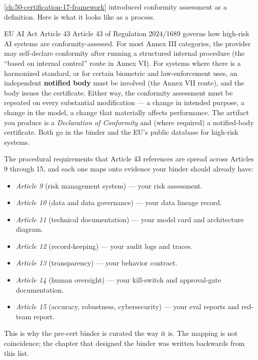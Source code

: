 \autoref{ch:50-certification-17-framework} introduced conformity assessment as a definition. Here is what it looks like as a process.

\begin{TNinpractice}{EU AI Act Article 43} Article 43 of Regulation 2024/1689 \citep{euAIact2024} governs how high-risk AI systems are conformity-assessed. For most Annex III categories, the provider may self-declare conformity after running a structured internal procedure (the ``based on internal control'' route in Annex VI). For systems where there is a harmonized standard, or for certain biometric and law-enforcement uses, an independent \textbf{notified body} must be involved (the Annex VII route), and the body issues the certificate. Either way, the conformity assessment must be repeated on every substantial modification --- a change in intended purpose, a change in the model, a change that materially affects performance. The artifact you produce is a \textit{Declaration of Conformity} and (where required) a notified-body certificate. Both go in the binder and the EU's public database for high-risk systems. \end{TNinpractice}

The procedural requirements that Article 43 references are spread across Articles 9 through 15, and each one maps onto evidence your binder should already have:

\begin{itemize}
\item \textit{Article 9} (risk management system) --- your risk assessment.
\item \textit{Article 10} (data and data governance) --- your data lineage record.
\item \textit{Article 11} (technical documentation) --- your model card and architecture diagram.
\item \textit{Article 12} (record-keeping) --- your audit logs and traces.
\item \textit{Article 13} (transparency) --- your behavior contract.
\item \textit{Article 14} (human oversight) --- your kill-switch and approval-gate documentation.
\item \textit{Article 15} (accuracy, robustness, cybersecurity) --- your eval reports and red-team report.
\end{itemize}

This is why the pre-cert binder is curated the way it is. The mapping is not coincidence; the chapter that designed the binder was written backwards from this list.

